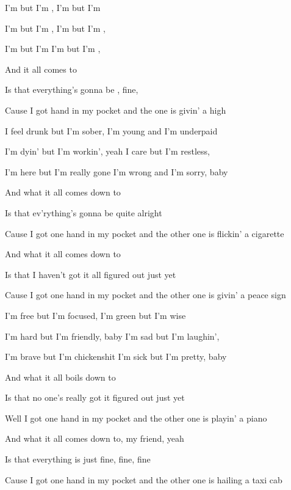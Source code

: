 

\zs
I'm  but I'm ,
I'm  but I'm 

I'm  but I'm , 
I'm  but I'm ,

I'm  but I'm 
I'm  but I'm , 
\ks

\zr
And  it all comes  to 

Is that everything's gonna be , fine, 

Cause I got  hand in my pocket
and the  one is givin' a high 
\kr

\zs
I feel drunk but I'm sober,
I'm young and I'm underpaid

I'm dyin' but I'm workin', yeah
I care but I'm restless,

I'm here but I'm really gone
I'm wrong and I'm sorry, baby
\ks

\zr
And what it all comes down to

Is that ev'rything's gonna be quite alright

Cause I got one hand in my pocket
and the other one is flickin' a cigarette
\kr

\zr
And what it all comes down to

Is that I haven't got it all figured out just yet

Cause I got one hand in my pocket
and the other one is givin' a peace sign
\kr

\zs
I'm free but I'm focused,
I'm green but I'm wise

I'm hard but I'm friendly, baby
I'm sad but I'm laughin',

I'm brave but I'm chickenshit
I'm sick but I'm pretty, baby
\ks

\zr
And what it all boils down to

Is that no one's really got it figured out just yet

Well I got one hand in my pocket
and the other one is playin' a piano
\kr

\zr
And what it all comes down to, my friend, yeah

Is that everything is just fine, fine, fine

Cause I got one hand in my pocket
and the other one is hailing a taxi cab
\kr

\kp





